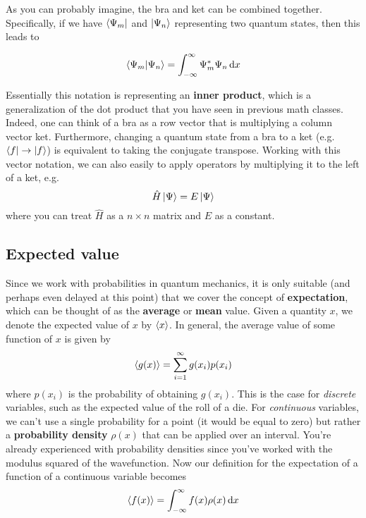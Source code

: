 As you can probably imagine, the bra and ket can be combined together. Specifically, if we have $\bra{\Psi_m}$ and $\ket{\Psi_n}$ representing two quantum states, then this leads to
\begin{tcolorbox}[title = Bra-ket inner product] \vspace{-2ex}
	\begin{equation}
		\braket{\Psi_m}{\Psi_n} = 
		\int_{-\infty}^{\infty} \Psi_m^*\Psi_n \dd{x} \label{eq:bk-int}
	\end{equation}
\end{tcolorbox}

Essentially this notation is representing an \textbf{inner product}, which is a generalization of the dot product that you have seen in previous math classes. Indeed, one can think of a bra as a row vector that is multiplying a column vector ket. Furthermore, changing a quantum state from a bra to a ket (e.g. $\bra{f} \rightarrow \ket{f}$) is equivalent to taking the conjugate transpose. Working with this vector notation, we can also easily to apply operators by multiplying it to the left of a ket, e.g.
\begin{equation*}
	\hat{H} \ket{\Psi} = E\ket{\Psi} 
\end{equation*}
where you can treat $\hat{H}$ as a $n\times n$ matrix and $E$ as a constant.


\subsection{Expected value}
Since we work with probabilities in quantum mechanics, it is only suitable (and perhaps even delayed at this point) that we cover the concept of \textbf{expectation}, which can be thought of as the \textbf{average} or \textbf{mean} value. Given a quantity $x$, we denote the expected value of $x$ by $\expval{x}$. In general, the average value of some function of $x$ is given by 
\begin{equation}
	\expval{g(x)} = \sum_{i=1}^{\infty} g(x_i) p(x_i)
\end{equation}
where $p(x_i)$ is the probability of obtaining $g(x_i)$. This is the case for \emph{discrete} variables, such as the expected value of the roll of a die. For \emph{continuous} variables, we can't use a single probability for a point (it would be equal to zero) but rather a \textbf{probability density} $\rho(x)$ that can be applied over an interval. You're already experienced with probability densities since you've worked with the modulus squared of the wavefunction. Now our definition for the expectation of a function of a continuous variable becomes
\begin{equation}
	\expval{f(x)} = \int_{-\infty}^{\infty} f(x) \rho(x) \dd{x}
\end{equation}


